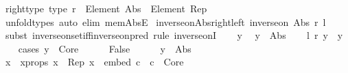 \begin{isabellebody}
\isanewline
{}\isamarkupfalse%
%
\endisatagproof
{\isafoldproof}%
%
\isadelimproof
\isanewline
%
\endisadelimproof
\isanewline
{}\isamarkupfalse%
\ right{\isacharunderscore}{\kern0pt}type\ {\isacharbrackleft}{\kern0pt}type{\isacharbrackright}{\kern0pt}{\isacharcolon}{\kern0pt}\ {\isachardoublequoteopen}r\ {\isacharcolon}{\kern0pt}\ Element\ Abs\ {\isasymRightarrow}\ Element\ Rep{\isachardoublequoteclose}\isanewline
%
\isadelimproof
\ \ %
\endisadelimproof
%
\isatagproof
{}\isamarkupfalse%
\ unfold{\isacharunderscore}{\kern0pt}types\ {\isacharparenleft}{\kern0pt}auto\ elim{\isacharcolon}{\kern0pt}\ mem{\isacharunderscore}{\kern0pt}AbsE{\isacharparenright}{\kern0pt}%
\endisatagproof
{\isafoldproof}%
%
\isadelimproof
\isanewline
%
\endisadelimproof
\isanewline
{}\isamarkupfalse%
\ inverse{\isacharunderscore}{\kern0pt}on{\isacharunderscore}{\kern0pt}Abs{\isacharunderscore}{\kern0pt}right{\isacharunderscore}{\kern0pt}left{\isacharcolon}{\kern0pt}\ {\isachardoublequoteopen}inverse{\isacharunderscore}{\kern0pt}on\ Abs\ r\ l{\isachardoublequoteclose}\isanewline
%
\isadelimproof
%
\endisadelimproof
%
\isatagproof
{}\isamarkupfalse%
\ {\isacharparenleft}{\kern0pt}subst\ inverse{\isacharunderscore}{\kern0pt}on{\isacharunderscore}{\kern0pt}set{\isacharunderscore}{\kern0pt}iff{\isacharunderscore}{\kern0pt}inverse{\isacharunderscore}{\kern0pt}on{\isacharunderscore}{\kern0pt}pred{\isacharcomma}{\kern0pt}\ rule\ inverse{\isacharunderscore}{\kern0pt}onI{\isacharparenright}{\kern0pt}\isanewline
\ \ \isamarkupfalse%
\ y\ \isamarkupfalse%
\ {\isachardoublequoteopen}y\ {\isasymin}\ Abs{\isachardoublequoteclose}\isanewline
\ \ \isamarkupfalse%
\ {\isachardoublequoteopen}l\ {\isacharparenleft}{\kern0pt}r\ y{\isacharparenright}{\kern0pt}\ {\isacharequal}{\kern0pt}\ y{\isachardoublequoteclose}\isanewline
\ \ \isamarkupfalse%
\ {\isacharparenleft}{\kern0pt}cases\ {\isachardoublequoteopen}y\ {\isasymin}\ Core{\isachardoublequoteclose}{\isacharparenright}{\kern0pt}\isanewline
\ \ \ \ \isamarkupfalse%
\ False\isanewline
\ \ \ \ \isamarkupfalse%
\ {\isacartoucheopen}y\ {\isasymin}\ Abs{\isacartoucheclose}\ \isamarkupfalse%
\ x\ \ x{\isacharunderscore}{\kern0pt}props{\isacharcolon}{\kern0pt}\ {\isachardoublequoteopen}x\ {\isasymin}\ Rep{\isachardoublequoteclose}\ {\isachardoublequoteopen}x\ {\isasymnotin}\ {\isacharbraceleft}{\kern0pt}embed\ c\ {\isacharbar}{\kern0pt}\ c\ {\isasymin}\ Core{\isacharbraceright}{\kern0pt}{\isachardoublequoteclose}\isanewline

\end{isabellebody}
